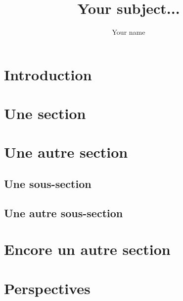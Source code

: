 \documentclass[12pt]{article}
\title{Your subject...}
\author{Your name}
\affiliation{Name of your lab and/or your University}
\begin{document}
\maketitle

{\normalsize
\section{Introduction}
	\lipsum*[1]
	\cite{compet08, workflow95}

\section{Une section}
	\lipsum*[1]


\section{Une autre section}

\subsection{Une sous-section}
	\lipsum*[1]

\subsection{Une autre sous-section}
	\lipsum*[1]


\section{Encore un autre section}
	\lipsum*[1]


\section{Perspectives}
	\lipsum*[1]
}

\pagestyle{plain}

\end{document}
